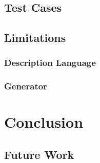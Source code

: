 \documentclass{UoYCSproject}
\begin{document}
\section{Test Cases}

\section{Limitations}

\subsection{Description Language}

\subsection{Generator}

\chapter{Conclusion}

\section{Future Work}

\printbibliography
\end{document}
